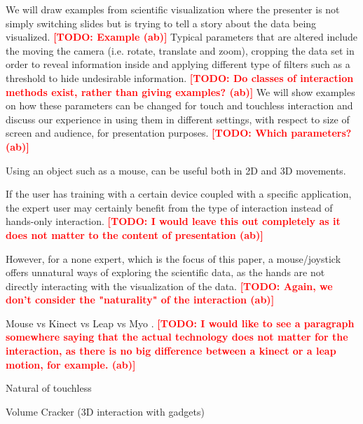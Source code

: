 \documentclass[review,journal]{vgtc}         %
\newcommand{\todo}[1]{\textbf{\textcolor{red}{[TODO: {#1}]}}}
\begin{document}
We will draw examples from scientific visualization where the presenter is not simply switching slides but is trying to tell a story about the data being visualized. \todo{Example (ab)}
Typical parameters that are altered include the moving the camera (i.e. rotate, translate and zoom), cropping the data set in order to reveal information inside and applying different type of filters such as a threshold to hide undesirable information. \todo{Do classes of interaction methods exist, rather than giving examples? (ab)}
We will show examples on how these parameters can be changed for touch and touchless interaction and discuss our experience in using them in different settings, with respect to size of screen and audience, for presentation purposes. \todo{Which parameters? (ab)}
%

Using an object such as a mouse, can be useful both in 2D and 3D movements.

If the user has training with a certain device coupled with a specific application, the expert user may certainly benefit from the type of interaction instead of hands-only interaction. \todo{I would leave this out completely as it does not matter to the content of presentation (ab)}

However, for a none expert, which is the focus of this paper, a mouse/joystick offers unnatural ways of exploring the scientific data, as the hands are not directly interacting with the visualization of the data. \todo{Again, we don't consider the "naturality" of the interaction (ab)}

Mouse vs Kinect vs Leap vs Myo \cite{doi:10.1117/12.2006994}. \todo{I would like to see a paragraph somewhere saying that the actual technology does not matter for the interaction, as there is no big difference between a kinect or a leap motion, for example. (ab)}

Natural of touchless \cite{O'hara:2013:NTP:2442106.2442111}

Volume Cracker (3D interaction with gadgets) \cite{Laha:2013:VCB:2491367.2491368}
\end{document}
